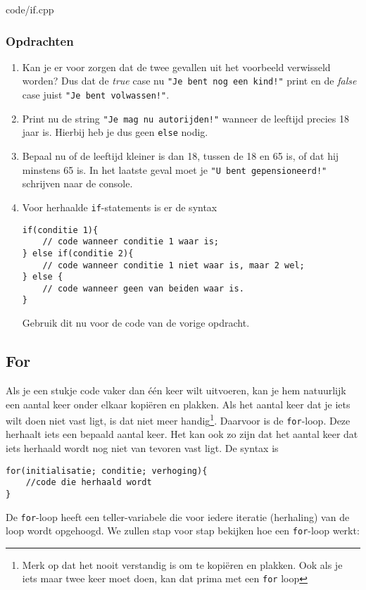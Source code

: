 \documentclass[12pt,a4paper]{article}
\newcommand{\code}{}
\newcommand{\icode}{\lstinline}
\begin{document}
\code{code/if.cpp}

\subsubsection{Opdrachten}
\begin{enumerate}
		\item
		Kan je er voor zorgen dat de twee gevallen uit het voorbeeld verwisseld worden? Dus dat de \emph{true} case nu \icode{"Je bent nog een kind!"} print en de \emph{false} case juist \icode{"Je bent volwassen!"}.
		\item
			Print nu de string \icode{"Je mag nu autorijden!"} wanneer de leeftijd precies 18 jaar is. Hierbij heb je dus geen \icode{else} nodig.
		\item
			Bepaal nu of de leeftijd kleiner is dan 18, tussen de 18 en 65 is, of dat hij minstens 65 is. In het laatste geval moet je \icode{"U bent gepensioneerd!"} schrijven naar de console.
		\item
			Voor herhaalde \icode{if}-statements is er de syntax
\begin{lstlisting}
if(conditie 1){
	// code wanneer conditie 1 waar is;
} else if(conditie 2){
	// code wanneer conditie 1 niet waar is, maar 2 wel;
} else {
	// code wanneer geen van beiden waar is.
}
\end{lstlisting}
Gebruik dit nu voor de code van de vorige opdracht.
\end{enumerate}


\subsection{For}
Als je een stukje code vaker dan \'e\'en keer wilt uitvoeren, kan je hem natuurlijk een aantal keer onder elkaar kopi\"eren en plakken. Als het aantal keer dat je iets wilt doen niet vast ligt, is dat niet meer handig\footnote{Merk op dat het nooit verstandig is om te kopi\"eren en plakken. Ook als je iets maar twee keer moet doen, kan dat prima met een \icode{for} loop}. Daarvoor is de \icode{for}-loop.
Deze herhaalt iets een bepaald aantal keer. Het kan ook zo zijn dat het aantal keer dat iets herhaald wordt nog niet van tevoren vast ligt. De syntax is 
\begin{lstlisting}
for(initialisatie; conditie; verhoging){
	//code die herhaald wordt
}
\end{lstlisting}
De \icode{for}-loop heeft een teller-variabele die voor iedere iteratie (herhaling) van de loop wordt opgehoogd. We zullen stap voor stap bekijken hoe een \icode{for}-loop werkt:
\end{document}
